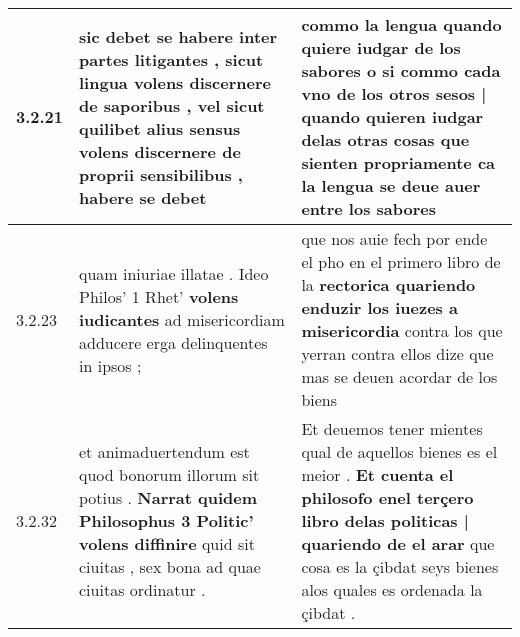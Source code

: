 \begin{tabular}{|p{1cm}|p{6.5cm}|p{6.5cm}|}
3.2.21 & sic debet se habere inter partes litigantes , sicut lingua volens discernere de saporibus , \textbf{ vel sicut quilibet alius sensus volens discernere } de proprii sensibilibus , habere se debet & commo la lengua quando quiere iudgar de los sabores \textbf{ o si commo cada vno de los otros sesos | quando quieren iudgar delas otras cosas } que sienten propriamente ca la lengua se deue auer entre los sabores \\\hline
3.2.23 & quam iniuriae illatae . Ideo Philos’ 1 Rhet’ \textbf{ volens iudicantes } ad misericordiam adducere erga delinquentes in ipsos ; & que nos auie fech por ende el pho en el primero libro de la \textbf{ rectorica quariendo enduzir los iuezes a misericordia } contra los que yerran contra ellos dize que mas se deuen acordar de los biens \\\hline
3.2.32 & et animaduertendum est quod bonorum illorum sit potius . \textbf{ Narrat quidem Philosophus 3 Politic’ volens diffinire } quid sit ciuitas , sex bona ad quae ciuitas ordinatur . & Et deuemos tener mientes qual de aquellos bienes es el meior . \textbf{ Et cuenta el philosofo enel terçero libro delas politicas | quariendo de el arar } que cosa es la çibdat seys bienes alos quales es ordenada la çibdat . \\\hline

\end{tabular}
